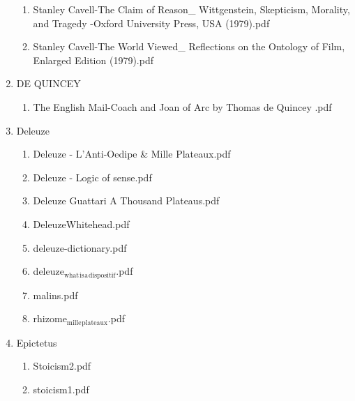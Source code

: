 \documentclass[11pt]{article}
\begin{document}
\begin{enumerate}
\begin{enumerate}
\item Stanley Cavell-The Claim of Reason\_ Wittgenstein, Skepticism, Morality, and Tragedy -Oxford University Press, USA (1979).pdf
\label{sec-1-1-1-1-34-32-15}

\item Stanley Cavell-The World Viewed\_ Reflections on the Ontology of Film, Enlarged Edition (1979).pdf
\label{sec-1-1-1-1-34-32-16}
\end{enumerate}

\item DE QUINCEY
\label{sec-1-1-1-1-34-33}
\begin{enumerate}
\item The English Mail-Coach and Joan of Arc by Thomas de Quincey .pdf
\label{sec-1-1-1-1-34-33-1}
\end{enumerate}

\item Deleuze
\label{sec-1-1-1-1-34-34}
\begin{enumerate}
\item Deleuze - L'Anti-Oedipe \& Mille Plateaux.pdf
\label{sec-1-1-1-1-34-34-1}

\item Deleuze - Logic of sense.pdf
\label{sec-1-1-1-1-34-34-2}

\item Deleuze Guattari A Thousand Plateaus.pdf
\label{sec-1-1-1-1-34-34-3}

\item DeleuzeWhitehead.pdf
\label{sec-1-1-1-1-34-34-4}

\item deleuze-dictionary.pdf
\label{sec-1-1-1-1-34-34-5}

\item deleuze$_{\text{what}}$$_{\text{is}}$$_{\text{a}}$$_{\text{dispositif}}$.pdf
\label{sec-1-1-1-1-34-34-6}

\item malins.pdf
\label{sec-1-1-1-1-34-34-7}

\item rhizome$_{\text{mille}}$$_{\text{plateaux}}$.pdf
\label{sec-1-1-1-1-34-34-8}
\end{enumerate}

\item Epictetus
\label{sec-1-1-1-1-34-35}
\begin{enumerate}
\item Stoicism2.pdf
\label{sec-1-1-1-1-34-35-1}

\item stoicism1.pdf
\label{sec-1-1-1-1-34-35-2}
\end{enumerate}


\end{enumerate}
\end{document}

